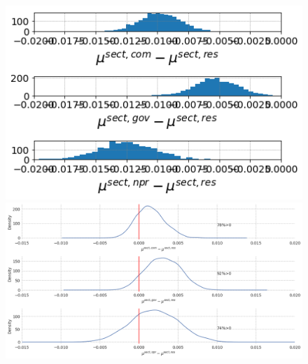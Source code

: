 \documentclass[a4paper]{article}
\begin{document}


\begin{figure} [!htb]
\begin{minipage}{.48\textwidth}
  \centering
  \includegraphics[width=1\linewidth]{figures/mu_sectors.png}

 \end{minipage}\qquad
\begin{minipage}{.48\textwidth}
  \centering
  \includegraphics[width=1\linewidth]{figures/mu_sectors_const.png}

 \end{minipage}

\bigskip


\end{figure}
\end{document}
